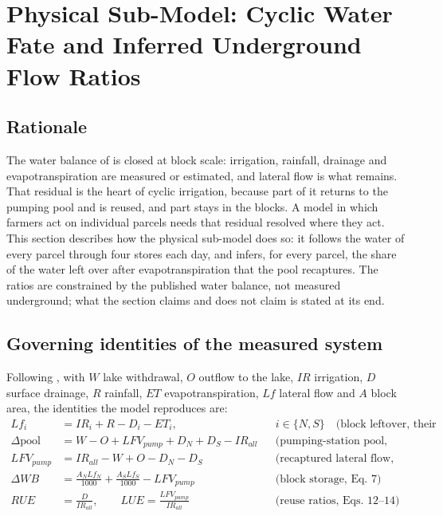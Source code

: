 \documentclass{article}
\begin{document}
\section{Physical Sub-Model: Cyclic Water Fate and Inferred Underground Flow Ratios}
\label{sec:physical}
\begin{added}
\subsection{Rationale}
The water balance of \cite{Okura2025WaterBalance} is closed at block scale: irrigation, rainfall, drainage and evapotranspiration are measured or estimated, and lateral flow is what remains. That residual is the heart of cyclic irrigation, because part of it returns to the pumping pool and is reused, and part stays in the blocks. A model in which farmers act on individual parcels needs that residual resolved where they act. This section describes how the physical sub-model does so: it follows the water of every parcel through four stores each day, and infers, for every parcel, the share of the water left over after evapotranspiration that the pool recaptures. The ratios are constrained by the published water balance, not measured underground; what the section claims and does not claim is stated at its end.

\subsection{Governing identities of the measured system}
Following \cite{Okura2025WaterBalance}, with $W$ lake withdrawal, $O$ outflow to the lake, $IR$ irrigation, $D$ surface drainage, $R$ rainfall, $ET$ evapotranspiration, $Lf$ lateral flow and $A$ block area, the identities the model reproduces are:
\begin{align}
Lf_i &= IR_i + R - D_i - ET_i, && i \in \{N, S\} \quad \text{(block leftover, their Eq.~3)} \label{eq:okura_lf}\\
\Delta\text{pool} &= W - O + LFV_{pump} + D_N + D_S - IR_{all} && \text{(pumping-station pool, Eq.~4)} \\
LFV_{pump} &= IR_{all} - W + O - D_N - D_S && \text{(recaptured lateral flow, Eq.~6)} \\
\Delta WB &= \frac{A_N Lf_N}{1000} + \frac{A_S Lf_S}{1000} - LFV_{pump} && \text{(block storage, Eq.~7)} \label{eq:okura_wb}\\
RUE &= \frac{D}{IR_{all}}, \qquad LUE = \frac{LFV_{pump}}{IR_{all}} && \text{(reuse ratios, Eqs.~12--14)}
\end{align}


\end{added}
\end{document}
